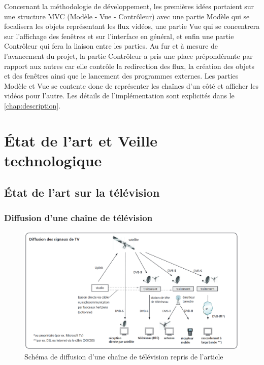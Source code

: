 \documentclass{polytech/polytech}
\begin{document}
Concernant la méthodologie de développement, les premières idées portaient sur une structure MVC (Modèle - Vue - Contrôleur) avec une partie Modèle qui se focalisera les objets représentant les flux vidéos, une partie Vue qui se concentrera sur l'affichage des fenêtres et sur l'interface en général, et enfin une partie Contrôleur qui fera la liaison entre les parties. Au fur et à mesure de l'avancement du projet, la partie Contrôleur a pris une place prépondérante par rapport aux autres car elle contrôle la redirection des flux, la création des objets et des fenêtres ainsi que le lancement des programmes externes. Les parties Modèle et Vue se contente donc de représenter les chaînes d'un côté et afficher les vidéos pour l'autre. Les détails de l'implémentation sont explicités dans le \autoref{chap:description}.


\part{\'{E}tat de l'art et Veille technologique}


\chapter{\'{E}tat de l'art sur la télévision}

\section{Diffusion d'une chaîne de télévision}


\begin{figure}
	\includegraphics[scale=0.37]{images/diffusionTV.png}
	\caption{Schéma de diffusion d'une chaîne de télévision repris de l'article \cite{_diffusion_2018}}
	\label{fig:diffusionTV}
\end{figure}
\end{document}
